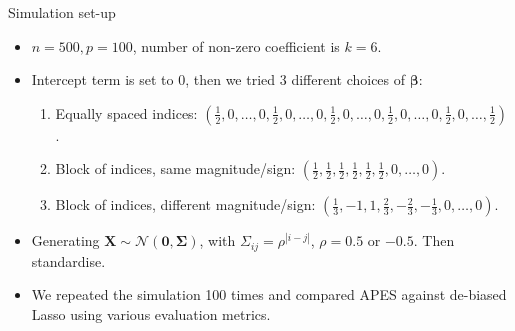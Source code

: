 \documentclass[12pt,aspectratio=169]{beamer}
\newcommand{\bX}{\boldsymbol{X}}
\newcommand{\bbeta}{\boldsymbol{\beta}}
\begin{document}
\begin{frame}{Simulation set-up}
	\begin{itemize}
		\item $ n  = 500,  p = 100$, number of non-zero coefficient is $ k = 6 $.
		
		\item Intercept term is set to 0, then we tried 3 different choices of $ \bbeta $: 
		\begin{enumerate}
			\item Equally spaced indices: $ (\frac{1}{2}, 0, \dots, 0,\frac{1}{2}, 0, \dots,0,\frac{1}{2}, 0, \dots, 0,\frac{1}{2}, 0, \dots, 0,\frac{1}{2}, 0, \dots, \frac{1}{2}) $.
			\item Block of indices, same magnitude/sign: $ (\frac{1}{2}, \frac{1}{2}, \frac{1}{2}, \frac{1}{2}, \frac{1}{2}, \frac{1}{2}, 0, \dots, 0) $.
			\item Block of indices, different magnitude/sign: $ (\frac{1}{3}, -1, 1, \frac{2}{3}, -\frac{2}{3}, -\frac{1}{3}, 0, \dots, 0) $.
		\end{enumerate}
		
		\item Generating $ \bX \sim \mathcal{N}(\boldsymbol{0}, \boldsymbol{\Sigma})$, with $ \Sigma_{ij} = \rho^{|i-j|} $, $ \rho = 0.5 $ or $ -0.5 $. Then standardise. 
		
		
		
		
		\item We repeated the simulation 100 times and compared APES against de-biased Lasso using various evaluation metrics.
	\end{itemize}
\end{frame}

%	
%	
%	
\end{document}
